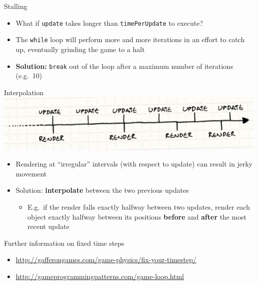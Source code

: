 \begin{frame}{Stalling}
    \begin{itemize}
        \item What if \lstinline{update} takes longer than \lstinline{timePerUpdate} to execute? \pause
        \item The \lstinline{while} loop will perform more and more iterations in an effort
            to catch up, eventually grinding the game to a halt \pause
        \item \textbf{Solution:} \lstinline{break} out of the loop after a maximum number of iterations
            (e.g.\ 10)
    \end{itemize}
\end{frame}

\begin{frame}{Interpolation}
    \includegraphics[width=\textwidth]{game-loop-timeline} \pause
    \begin{itemize}
        \item Rendering at ``irregular'' intervals (with respect to update) can result in
            jerky movement \pause
        \item Solution: \textbf{interpolate} between the two previous updates \pause
            \begin{itemize}
                \item E.g.\ if the render falls exactly halfway between two updates,
                    render each object exactly halfway between its positions
                    \textbf{before} and \textbf{after} the most recent update
            \end{itemize}
    \end{itemize}
\end{frame}

\begin{frame}{Further information on fixed time steps}
    \begin{itemize}
        \item \url{http://gafferongames.com/game-physics/fix-your-timestep/}
        \item \url{http://gameprogrammingpatterns.com/game-loop.html}
    \end{itemize}
\end{frame}

